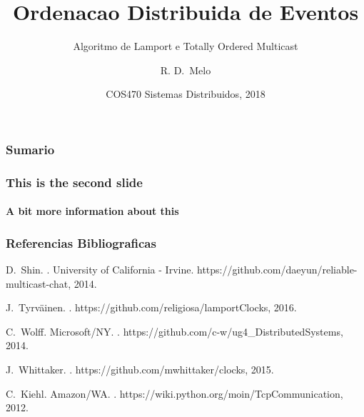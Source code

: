 \documentclass{beamer}
\title[Ordenacao Distribuida] %
    {Ordenacao Distribuida de Eventos}
\subtitle{Algoritmo de Lamport e Totally Ordered Multicast}
\author[Melo] %
    {R. D.~Melo\inst{1}}
\institute[Universidade Federal do Rio de Janeiro (UFRJ)] %
    {
    \inst{1}%
    Departamento de Engenharia de Computacao e Informacao\\
    ECI/UFRJ
    }
\date[2018] %
    {COS470 Sistemas Distribuidos, 2018}
\begin{document}
        \frame{\titlepage}
        \begin{frame}
            \frametitle{Sumario}
            \tableofcontents[currentsection]
        \end{frame}
        \begin{frame}
            \frametitle{This is the second slide}
            \framesubtitle{A bit more information about this}
        \end{frame}

        \begin{frame}[allowframebreaks]
            \frametitle<presentation>{Referencias Bibliograficas}
            \begin{thebibliography}{10}

                \beamertemplateonlinebibitems
                D.~Shin.
                .
                \newblock University of California - Irvine.
                \newblock https://github.com/daeyun/reliable-multicast-chat, 2014.

                \beamertemplateonlinebibitems
                J.~Tyrväinen.
                .
                \newblock https://github.com/religiosa/lamportClocks, 2016.

                \beamertemplateonlinebibitems
                C.~Wolff.
                \newblock Microsoft/NY.
                .
                \newblock https://github.com/c-w/ug4\_DistributedSystems, 2014.

                \beamertemplateonlinebibitems
                J.~Whittaker.
                .
                \newblock https://github.com/mwhittaker/clocks, 2015.

                \beamertemplateonlinebibitems
                C.~Kiehl.
                \newblock Amazon/WA.
                .
                \newblock https://wiki.python.org/moin/TcpCommunication, 2012.

            \end{thebibliography}
          \end{frame}
    
\end{document}
